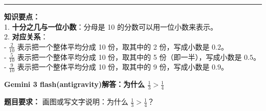 \vspace{1.0cm}
\hrule
\vspace{0.4cm}

{\small
\textbf{知识要点：} \\
1. \textbf{十分之几与一位小数}：分母是 10 的分数可以用一位小数来表示。 \\
2. \textbf{对应关系}： \\
   - $\frac{2}{10}$ 表示把一个整体平均分成 10 份，取其中的 2 份，写成小数是 $0.2$。 \\
   - $\frac{5}{10}$ 表示把一个整体平均分成 10 份，取其中的 5 份（即一半），写成小数是 $0.5$。 \\
   - $\frac{9}{10}$ 表示把一个整体平均分成 10 份，取其中的 9 份，写成小数是 $0.9$。
}




\newpage

\begin{center}
  {\large\bfseries Gemini 3 flash(antigravity)解答：为什么 $\frac{1}{3} > \frac{1}{4}$}
\end{center}

\vspace{0.6cm}

\noindent
{\small \textbf{题目要求：} 画图或写文字说明：为什么 $\frac{1}{3} > \frac{1}{4}$？}

\vspace{1.0cm}

